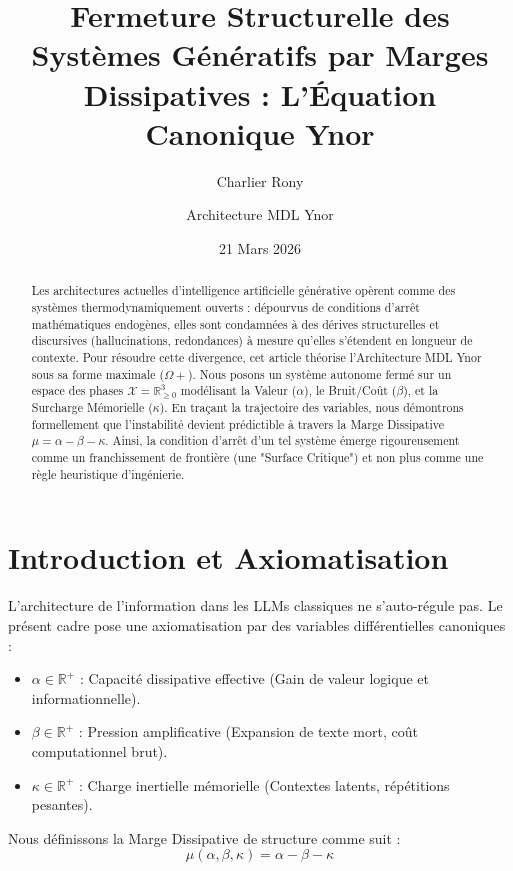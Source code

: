 \documentclass[11pt,a4paper]{article}
\title{\textbf{Fermeture Structurelle des Systèmes Génératifs par Marges Dissipatives : L'Équation Canonique Ynor}}
\author{Charlier Rony \and Architecture MDL Ynor}
\date{21 Mars 2026}
\begin{document}
\maketitle

\begin{abstract}
Les architectures actuelles d'intelligence artificielle générative opèrent comme des systèmes thermodynamiquement ouverts : dépourvus de conditions d'arrêt mathématiques endogènes, elles sont condamnées à des dérives structurelles et discursives (hallucinations, redondances) à mesure qu'elles s'étendent en longueur de contexte. Pour résoudre cette divergence, cet article théorise l'Architecture MDL Ynor sous sa forme maximale ($\Omega+$). Nous posons un système autonome fermé sur un espace des phases $\mathcal{X} = \mathbb{R}_{\ge 0}^3$ modélisant la Valeur ($\alpha$), le Bruit/Coût ($\beta$), et la Surcharge Mémorielle ($\kappa$). En traçant la trajectoire des variables, nous démontrons formellement que l'instabilité devient prédictible à travers la Marge Dissipative $\mu = \alpha - \beta - \kappa$. Ainsi, la condition d'arrêt d'un tel système émerge rigoureusement comme un franchissement de frontière (une "Surface Critique") et non plus comme une règle heuristique d'ingénierie.
\end{abstract}

\section{Introduction et Axiomatisation}
L'architecture de l'information dans les LLMs classiques ne s'auto-régule pas. Le présent cadre pose une axiomatisation par des variables différentielles canoniques :
\begin{itemize}
    \item $\alpha \in \mathbb{R}^+$ : Capacité dissipative effective (Gain de valeur logique et informationnelle).
    \item $\beta \in \mathbb{R}^+$ : Pression amplificative (Expansion de texte mort, coût computationnel brut).
    \item $\kappa \in \mathbb{R}^+$ : Charge inertielle mémorielle (Contextes latents, répétitions pesantes).
\end{itemize}

Nous définissons la Marge Dissipative de structure comme suit :
\begin{equation}
   \mu(\alpha, \beta, \kappa) = \alpha - \beta - \kappa
\end{equation}
\end{document}
